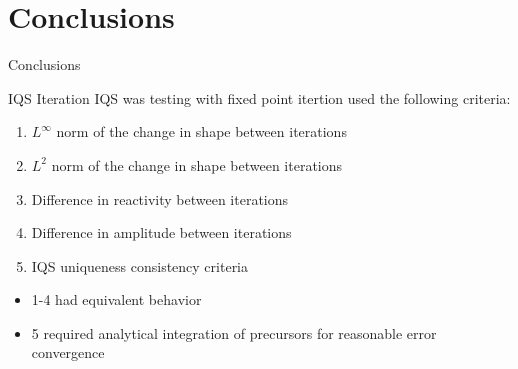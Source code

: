 \documentclass[8pt,xcolor=dvipnames]{beamer}
\begin{document}
\section{Conclusions}

\begin{frame}{Conclusions}

\begin{block}{IQS Iteration}
IQS was testing with fixed point itertion used the following criteria:
\begin{enumerate}
\item $L^\infty$ norm of the change in shape between iterations
\item $L^2$ norm of the change in shape between iterations
\item Difference in reactivity between iterations
\item Difference in amplitude between iterations
\item IQS uniqueness consistency criteria
\end{enumerate}
\begin{itemize}
\item 1-4 had equivalent behavior
\item 5 required analytical integration of precursors for reasonable error convergence
\end{itemize}
\end{block}

\end{frame}
\end{document}
